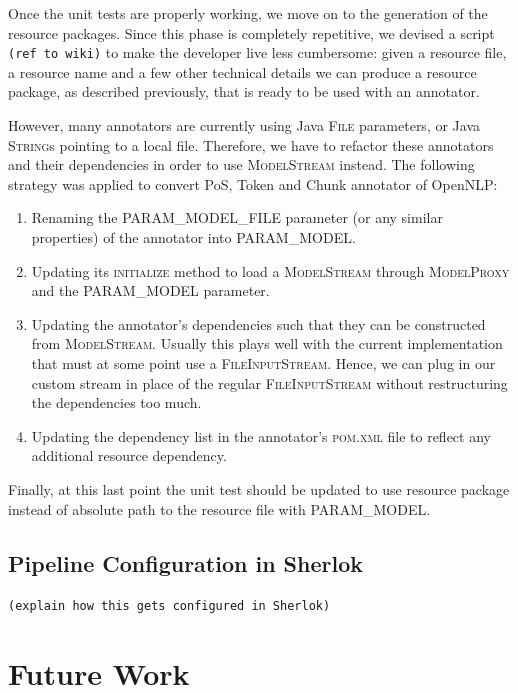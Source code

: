 \documentclass{article}
\newcommand{\ID}[1]{{\textsc{#1}}}
\newcommand{\TODO}[1]{\texttt{\textcolor{YellowOrange}{(#1)}}} %
\begin{document}
Once the unit tests are properly working, we move on to the generation of the resource packages. Since this phase is completely repetitive, we devised a script \TODO{ref to wiki} to make the developer live less cumbersome: given a resource file, a resource name and a few other technical details we can produce a resource package, as described previously, that is ready to be used with an annotator.

However, many annotators are currently using Java \ID{File} parameters, or Java \ID{String}s pointing to a local file. Therefore, we have to refactor these annotators and their dependencies in order to use \ID{ModelStream} instead. The following strategy was applied to convert PoS, Token and Chunk annotator of OpenNLP:

\begin{enumerate}

\item Renaming the \ID{PARAM\_MODEL\_FILE} parameter (or any similar properties) of the annotator into \ID{PARAM\_MODEL}.

\item Updating its \ID{initialize} method to load a \ID{ModelStream} through \ID{ModelProxy} and the \ID{PARAM\_MODEL} parameter.

\item Updating the annotator's dependencies such that they can be constructed from \ID{ModelStream}. Usually this plays well with the current implementation that must at some point use a \ID{FileInputStream}. Hence, we can plug in our custom stream in place of the regular \ID{FileInputStream} without restructuring the dependencies too much.

\item Updating the dependency list in the annotator's \ID{pom.xml} file to reflect any additional resource dependency.

\end{enumerate}

Finally, at this last point the unit test should be updated to use resource package instead of
absolute path to the resource file with \ID{PARAM\_MODEL}.

\subsection{Pipeline Configuration in Sherlok}

\TODO{explain how this gets configured in Sherlok}


\section{Future Work}
\end{document}
